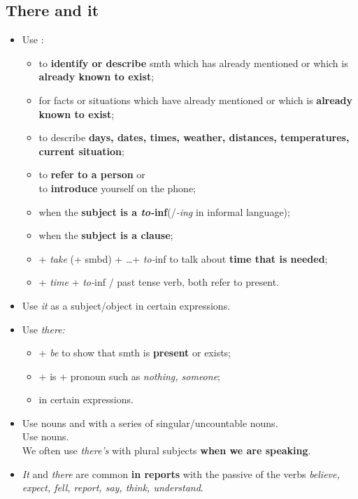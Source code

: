\subsection{There and it}
\begin{itemize}
    \item Use :
    \begin{itemize}
        \item {} to \textbf{identify or describe} smth
        which has already mentioned or which is \textbf{already known to exist};
        \item[\daash] for facts or situations
        which have already mentioned or which is \textbf{already known to exist};
        \item to describe \textbf{days, dates, times, weather, distances,
            temperatures, current situation};
        \item to \textbf{refer to a person} or\\
        to \textbf{introduce} yourself on the phone;
        \item[\daash] when the \textbf{subject is a \textit{to-}inf}(/\textit{-ing}
        in informal language);
        \item[\daash] when the \textbf{subject is a clause};
        \item[\aast] + \textit{take} (+ smbd) + \ldots + \textit{to-}inf
        to talk about \textbf{time that is needed};
        \item[\aast] + \textit{time} + \textit{to-}inf / past tense verb, both refer to present.
    \end{itemize}
    \item[\doot] Use \textit{it} as a subject/object in certain expressions.
    \item Use \textit{there:}
    \begin{itemize}
        \item + \textit{be} to show that smth is \textbf{present} or exists;
        \item[\doot] + is + pronoun such as \textit{nothing, someone};
        \item[\doot] in certain expressions.
    \end{itemize}
    \item Use  nouns
    and with a series of singular/uncountable nouns.\\
    Use  nouns.\\
    We often use \textit{there's} with plural subjects \textbf{when we are speaking}.
    \item[\doot] \textit{It} and \textit{there} are common \textbf{in reports}
    with the passive of the verbs \textit{believe, expect, fell, report, say, think, understand}.
\end{itemize}

